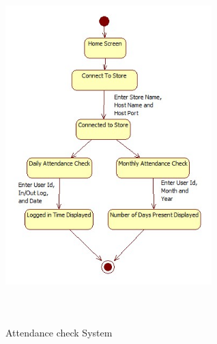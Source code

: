 \begin{figure}[h]
\centering
  \includegraphics[width=8cm,height=13cm]{Fig12.jpg}\\
  \caption{Attendance check  System}
  \label{Attendance check  System}
\end{figure}

